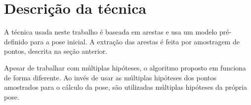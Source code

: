 \chapter{Descrição da técnica}

A técnica usada neste trabalho é baseada em arestas e usa um modelo pré-definido para a pose inicial. A extração das arestas é feita por amostragem de pontos, descrita na seção anterior.

\begin{comment}
\section{Trabalhando com múltiplas hipóteses}

Um dos problemas que ocorrem nas técnicas \emph{edge-based} é que nem sempre se consegue extrair com precisão as arestas da imagem. Na seção anterior foi discutido que um dos passos para a extração das arestas é a procura por pontos de alto gradiente na normal da aresta. Muitas vezes é possível encontrar vários desses pontos para cada amostra, e neste caso obtém-se múltiplas hipóteses de pontos da imagem correspondente ao ponto amostrado. Veja a \figref{cubo_0}.



O trabalho com múltiplas hipóteses foi inicialmente proposto em \cite{multiplas_hipoteses}. Neste trabalho cada aresta $E_i$ (do modelo) projetada na imagem tem um conjunto $\{e_{i,j}\}$ de pontos amostrados. Cada ponto $e_{i,j}$ tem um conjunto $\{e'_{i,j,l}\}$ de hipóteses de correspondência. Em \cite{multiplas_hipoteses} a hipótese $e'_{i,j,l}$ é aquela que tem a menor distância da aresta projetada $E_i$. Então mesmo que sejam encontrados pontos de forte gradiente na normal da aresta $E_i$, aquele que mais se aproxima da aresta projetada é escolhido como correspondente a $e_{i,j}$. Tendo este conjunto de correspondências, o processo continua como no caso de hipótese única.
\end{comment}

Apesar de trabalhar com múltiplas hipóteses, o algoritmo proposto em \cite{celine} funciona de forma diferente. Ao invés de usar  as múltiplas hipóteses dos pontos amostrados para o cálculo da pose, são utilizadas múltiplas hipóteses da própria pose.

